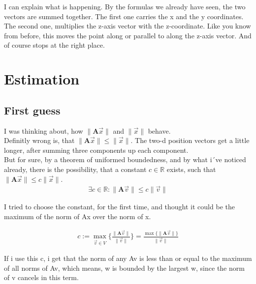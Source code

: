 \documentclass[a4paper]{article}
\begin{document}
I can explain what is happening. By the formulas we already have seen, the two vectors are summed together. The first one carries the x and the y coordinates. The second one, multiplies the z-axis vector with the z-coordinate. Like you know from before, this moves the point along or parallel to along the z-axis vector. And of course stops at the right place.


\section{Estimation}

\subsection{First guess}

I was thinking about, how $\|\boldsymbol{A}\vec{x}\|$ and $\|\vec{x}\|$ behave.\\

Definitly wrong is, that $\|\boldsymbol{A}\vec{x}\| \leq \|\vec{x}\|$. The two-d position vectors get a little longer, after summing three components up each component.\\ 

But for sure, by a theorem of uniformed boundedness, and by what i´ve noticed already,
there is the possibility, that a constant $c \in \mathbb{R}$ exists, such that $\|\boldsymbol{A}\vec{x}\| \leq c\|\vec{x}\|$.\\

\begin{displaymath}
\begin{align}
\exists c \in \mathbb{R}: \|\boldsymbol{A}\vec{v}\| \leq c\|\vec{v}\|
\end{align}
\end{displaymath}

I tried to choose the constant, for the first time, and thought it could be the maximum of the norm of Ax over the norm of x.

\begin{displaymath}
\begin{align}
c := \max_{\vec{v} \in V}\{ \frac{\|\boldsymbol{A}\vec{v}\|}{\|\vec{v}\|} \} = \frac{\max\{\|\boldsymbol{A}\vec{v}\|\}}{\|\vec{v}\|}
\end{align}
\end{displaymath}

If i use this c, i get that the norm of any Av is less than or equal to the maximum of all norms of Av, which means, w is bounded by the largest w, since the norm of v cancels in this term.
\end{document}
